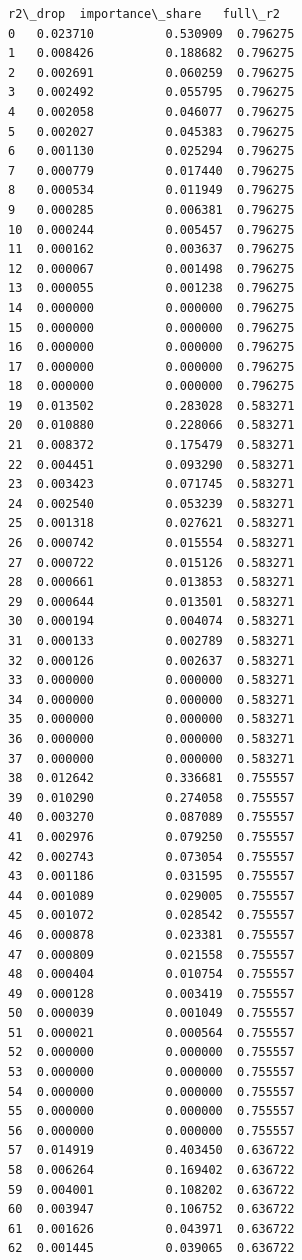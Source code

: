 \documentclass[11pt]{article}
\begin{document}
\begin{tcolorbox}[breakable, size=fbox, boxrule=.5pt, pad at break*=1mm, opacityfill=0]
\begin{Verbatim}[commandchars=\\\{\}]
     r2\_drop  importance\_share   full\_r2
0   0.023710          0.530909  0.796275
1   0.008426          0.188682  0.796275
2   0.002691          0.060259  0.796275
3   0.002492          0.055795  0.796275
4   0.002058          0.046077  0.796275
5   0.002027          0.045383  0.796275
6   0.001130          0.025294  0.796275
7   0.000779          0.017440  0.796275
8   0.000534          0.011949  0.796275
9   0.000285          0.006381  0.796275
10  0.000244          0.005457  0.796275
11  0.000162          0.003637  0.796275
12  0.000067          0.001498  0.796275
13  0.000055          0.001238  0.796275
14  0.000000          0.000000  0.796275
15  0.000000          0.000000  0.796275
16  0.000000          0.000000  0.796275
17  0.000000          0.000000  0.796275
18  0.000000          0.000000  0.796275
19  0.013502          0.283028  0.583271
20  0.010880          0.228066  0.583271
21  0.008372          0.175479  0.583271
22  0.004451          0.093290  0.583271
23  0.003423          0.071745  0.583271
24  0.002540          0.053239  0.583271
25  0.001318          0.027621  0.583271
26  0.000742          0.015554  0.583271
27  0.000722          0.015126  0.583271
28  0.000661          0.013853  0.583271
29  0.000644          0.013501  0.583271
30  0.000194          0.004074  0.583271
31  0.000133          0.002789  0.583271
32  0.000126          0.002637  0.583271
33  0.000000          0.000000  0.583271
34  0.000000          0.000000  0.583271
35  0.000000          0.000000  0.583271
36  0.000000          0.000000  0.583271
37  0.000000          0.000000  0.583271
38  0.012642          0.336681  0.755557
39  0.010290          0.274058  0.755557
40  0.003270          0.087089  0.755557
41  0.002976          0.079250  0.755557
42  0.002743          0.073054  0.755557
43  0.001186          0.031595  0.755557
44  0.001089          0.029005  0.755557
45  0.001072          0.028542  0.755557
46  0.000878          0.023381  0.755557
47  0.000809          0.021558  0.755557
48  0.000404          0.010754  0.755557
49  0.000128          0.003419  0.755557
50  0.000039          0.001049  0.755557
51  0.000021          0.000564  0.755557
52  0.000000          0.000000  0.755557
53  0.000000          0.000000  0.755557
54  0.000000          0.000000  0.755557
55  0.000000          0.000000  0.755557
56  0.000000          0.000000  0.755557
57  0.014919          0.403450  0.636722
58  0.006264          0.169402  0.636722
59  0.004001          0.108202  0.636722
60  0.003947          0.106752  0.636722
61  0.001626          0.043971  0.636722
62  0.001445          0.039065  0.636722

\end{Verbatim}
\end{tcolorbox}
\end{document}
